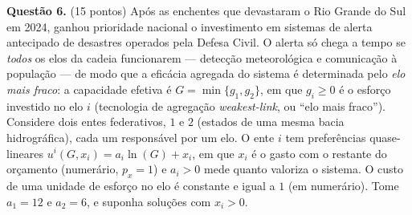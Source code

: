 
\textbf{Questão 6.} (15 pontos) Após as enchentes que devastaram o Rio Grande do Sul em 2024, ganhou prioridade nacional o investimento em sistemas de alerta antecipado de desastres operados pela Defesa Civil. O alerta só chega a tempo se \emph{todos} os elos da cadeia funcionarem --- detecção meteorológica e comunicação à população --- de modo que a eficácia agregada do sistema é determinada pelo \emph{elo mais fraco}: a capacidade efetiva é $G=\min\{g_1,g_2\}$, em que $g_i\ge 0$ é o esforço investido no elo $i$ (tecnologia de agregação \emph{weakest-link}, ou ``elo mais fraco''). Considere dois entes federativos, $1$ e $2$ (estados de uma mesma bacia hidrográfica), cada um responsável por um elo. O ente $i$ tem preferências quase-lineares $u^i(G,x_i)=a_i\ln(G)+x_i$, em que $x_i$ é o gasto com o restante do orçamento (numerário, $p_x=1$) e $a_i>0$ mede quanto valoriza o sistema. O custo de uma unidade de esforço no elo é constante e igual a $1$ (em numerário). Tome $a_1=12$ e $a_2=6$, e suponha soluções com $x_i>0$.

